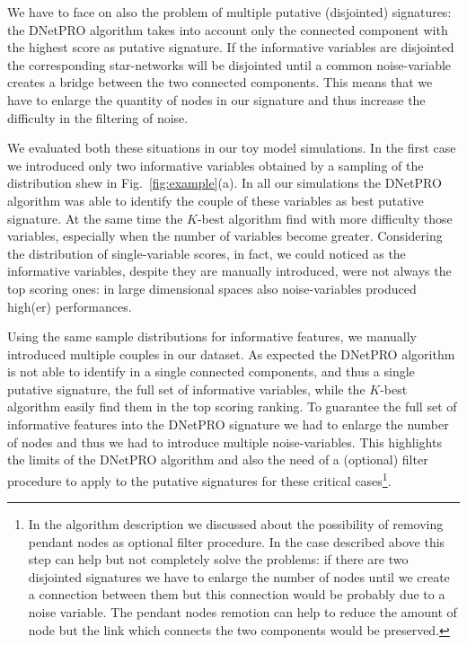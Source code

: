 \documentclass{standalone}
\begin{document}
We have to face on also the problem of multiple putative (disjointed) signatures: the DNetPRO algorithm takes into account only the connected component with the highest score as putative signature.
If the informative variables are disjointed the corresponding star-networks will be disjointed until a common noise-variable creates a bridge between the two connected components.
This means that we have to enlarge the quantity of nodes in our signature and thus increase the difficulty in the filtering of noise.

We evaluated both these situations in our toy model simulations.
In the first case we introduced only two informative variables obtained by a sampling of the distribution shew in Fig.~\ref{fig:example}(a).
In all our simulations the DNetPRO algorithm was able to identify the couple of these variables as best putative signature.
At the same time the $K$-best algorithm find with more difficulty those variables, especially when the number of variables become greater.
Considering the distribution of single-variable scores, in fact, we could noticed as the informative variables, despite they are manually introduced, were not always the top scoring ones: in large dimensional spaces also noise-variables produced high(er) performances.

Using the same sample distributions for informative features, we manually introduced multiple couples in our dataset.
As expected the DNetPRO algorithm is not able to identify in a single connected components, and thus a single putative signature, the full set of informative variables, while the $K$-best algorithm easily find them in the top scoring ranking.
To guarantee the full set of informative features into the DNetPRO signature we had to enlarge the number of nodes and thus we had to introduce multiple noise-variables.
This highlights the limits of the DNetPRO algorithm and also the need of a (optional) filter procedure to apply to the putative signatures for these critical cases\footnote{
  In the algorithm description we discussed about the possibility of removing pendant nodes as optional filter procedure.
  In the case described above this step can help but not completely solve the problems: if there are two disjointed signatures we have to enlarge the number of nodes until we create a connection between them but this connection would be probably due to a noise variable.
  The pendant nodes remotion can help to reduce the amount of node but the link which connects the two components would be preserved.
}.

\end{document}
